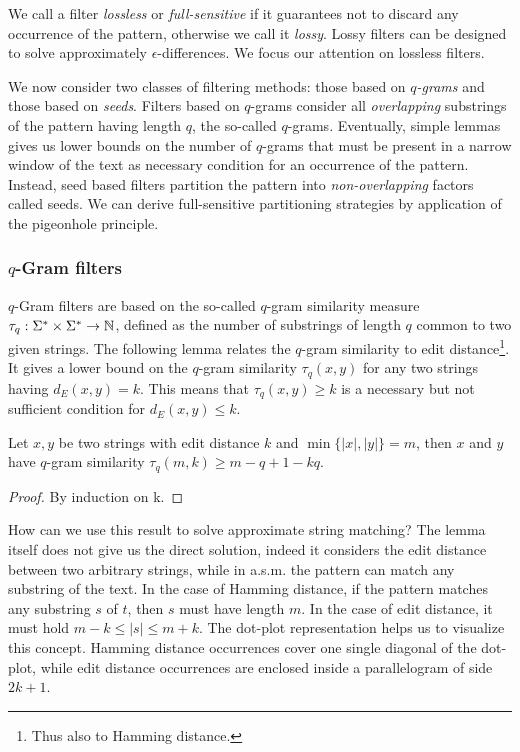We call a filter \emph{lossless} or \emph{full-sensitive} if it guarantees not to discard any occurrence of the pattern, otherwise we call it \emph{lossy}.
Lossy filters can be designed to solve approximately $\epsilon$-differences.
We focus our attention on lossless filters. 

We now consider two classes of filtering methods: those based on \emph{$q$-grams} and those based on \emph{seeds}.
Filters based on $q$-grams consider all \emph{overlapping} substrings of the pattern having length $q$, the so-called $q$-grams. Eventually, simple lemmas gives us lower bounds on the number of $q$-grams that must be present in a narrow window of the text as necessary condition for an occurrence of the pattern.
Instead, seed based filters partition the pattern into \emph{non-overlapping} factors called seeds.
We can derive full-sensitive partitioning strategies by application of the pigeonhole principle.

\subsubsection{$q$-Gram filters}

$q$-Gram filters are based on the so-called $q$-gram similarity measure $\tau_q : \Sigma^{*} \times \Sigma^{*} \rightarrow \mathbb {N}$, defined as the number of substrings of length $q$ common to two given strings.
The following lemma relates the $q$-gram similarity to edit distance\footnote{Thus also to Hamming distance.}.
It gives a lower bound on the $q$-gram similarity $\tau_q(x,y)$ for any two strings having $d_E(x,y) = k$.
This means that $\tau_q(x,y) \geq k$ is a necessary but not sufficient condition for $d_E(x,y) \leq k$.
\begin{lemma}
\cite{?}
Let $x,y$ be two strings with edit distance $k$ and $\min\{|x|,|y|\} = m$, then $x$ and $y$ have $q$-gram similarity $\tau_q(m,k) \geq m - q + 1 - kq$.
\end{lemma}
\begin{proof}
By induction on k.
\end{proof}

\begin{example}
\end{example}

How can we use this result to solve approximate string matching?
The lemma itself does not give us the direct solution, indeed it considers the edit distance between two arbitrary strings, while in a.s.m. the pattern can match any substring of the text.
In the case of Hamming distance, if the pattern matches any substring $s$ of $t$, then $s$ must have length $m$.
In the case of edit distance, it must hold $m - k \leq |s| \leq m + k$.
The dot-plot representation helps us to visualize this concept.
Hamming distance occurrences cover one single diagonal of the dot-plot, while edit distance occurrences are enclosed inside a parallelogram of side $2k+1$.

